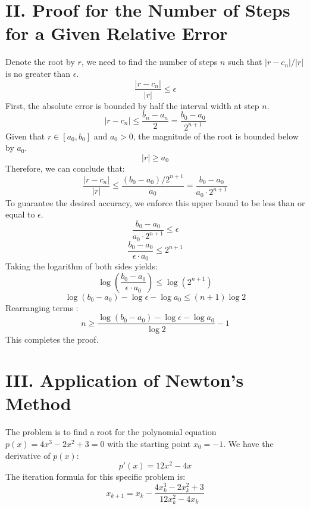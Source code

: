 \documentclass[a4paper]{article}
\begin{document}

\section*{II. Proof for the Number of Steps for a Given Relative Error}

Denote the root by $r$, we need to find the number of steps $n$ such that $|r-c_n|/|r|$ is no greater than $\epsilon$.
\[
\frac{|r-c_n|}{|r|} \le \epsilon
\]
First, the absolute error is bounded by half the interval width at step $n$.
\[
|r - c_n| \le \frac{b_n - a_n}{2} = \frac{b_0 - a_0}{2^{n+1}}
\]
Given that $r \in [a_0, b_0]$ and $a_0 > 0$, the magnitude of the root is bounded below by $a_0$.
\[
|r| \ge a_0
\]
Therefore, we can conclude that: 
\[
\frac{|r-c_n|}{|r|} \le \frac{(b_0 - a_0) / 2^{n+1}}{a_0} = \frac{b_0 - a_0}{a_0 \cdot 2^{n+1}}
\]
To guarantee the desired accuracy, we enforce this upper bound to be less than or equal to $\epsilon$.
\[
\frac{b_0 - a_0}{a_0 \cdot 2^{n+1}} \le \epsilon
\]
\[
\frac{b_0 - a_0}{\epsilon \cdot a_0} \le 2^{n+1}
\]
Taking the logarithm of both sides yields:
\[
\log\left(\frac{b_0 - a_0}{\epsilon \cdot a_0}\right) \le \log(2^{n+1})
\]
\[
\log(b_0 - a_0) - \log\epsilon - \log a_0 \le (n+1)\log 2
\]
Rearranging terms :
\[
n \ge \frac{\log(b_0 - a_0) - \log\epsilon - \log a_0}{\log 2} - 1
\]
This completes the proof.


\section*{III. Application of Newton's Method}

The problem is to find a root for the polynomial equation $p(x) = 4x^3 - 2x^2 + 3 = 0$ with the starting point $x_0 = -1$.
We have the derivative of $p(x)$:
\[
p'(x) = 12x^2 - 4x
\]
The iteration formula for this specific problem is:
\[
x_{k+1} = x_k - \frac{4x_k^3 - 2x_k^2 + 3}{12x_k^2 - 4x_k}
\]
\end{document}
